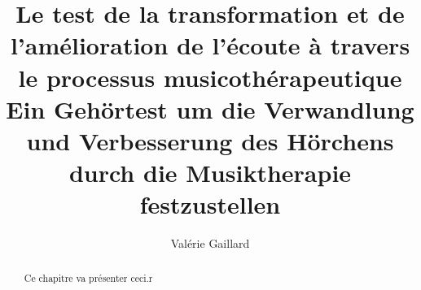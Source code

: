 \documentclass[12pt,pagesize, DIV=10, oneside, headsepline,
titlepage,parskip, headings=small, listof=totoc,
bibliography=totoc,index=totoc, captions=tableheading, final]{scrreprt}
\title{Le test de la transformation et de l'amélioration de l'écoute à travers le
  processus musicothérapeutique\\
Ein Gehörtest um die Verwandlung und Verbesserung des Hörchens durch
die Musiktherapie festzustellen}
\author{Valérie Gaillard}
\begin{document}

\tableofcontents
%

\begin{abstract}
	Ce chapitre va présenter ceci.r
\end{abstract}

%
%




\appendix

\printglossary[title=Glossaire, toctitle=Glossaire]
\label{bibliographie}
\printbibliography

\end{document}
